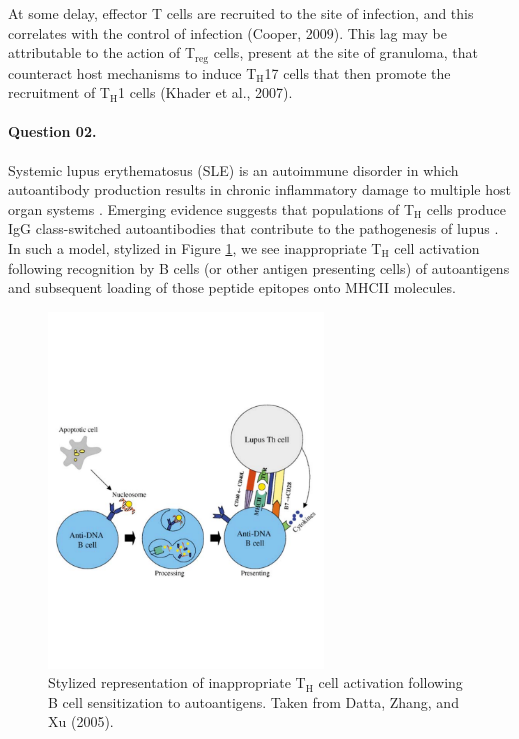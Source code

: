 \documentclass[11pt,letterpaper,final] {article}
\newcommand{\sub}[1]{\ensuremath{_{\text{#1}}}}
\begin{document}
At some delay, effector T cells are recruited to the site of infection, and this correlates with the control of infection (Cooper, 2009).  This lag may be attributable to the action of T\sub{reg} cells, present at the site of granuloma, that counteract host mechanisms to induce T\sub{H}17 cells that then promote the recruitment of T\sub{H}1 cells (Khader et al., 2007). 

\paragraph{Question 02.} Systemic lupus erythematosus (SLE) is an autoimmune disorder in which autoantibody production results in chronic inflammatory damage to multiple host organ systems \cite{Dong:2011}. Emerging evidence suggests that populations of T\sub{H} cells produce IgG class-switched autoantibodies that contribute to the pathogenesis of lupus \cite{Datta:2005}. In such a model, stylized in Figure \ref{fig:01}, we see inappropriate T\sub{H} cell activation following recognition by B cells (or other antigen presenting cells) of autoantigens and subsequent loading of those peptide epitopes onto MHCII molecules.

\begin{figure}[htp]
  \centering
    \includegraphics[width=0.65\textwidth]{sensitization}
	\caption{Stylized representation of inappropriate T\sub{H} cell activation following B cell sensitization to autoantigens. Taken from Datta, Zhang, and Xu (2005).}
	\label{fig:01}
\end{figure}
\end{document}

